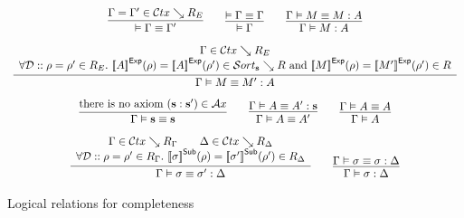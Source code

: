\begin{figure}
  \[
  \begin{array}{c}
    \infer{
      \eqctxsem \Gamma {\Gamma'}
    }{
      \Gamma = \Gamma' \in \perctx \searrow R_E
    }
    \qquad
    \infer{
      \wfctxsem \Gamma
    }{
      \eqctxsem \Gamma \Gamma
    }
    \qquad
    \infer{
      \wfexpsem \Gamma M A
    }{
      \eqexpsem \Gamma M M A
    }
    \\[8pt]
    \infer{
      \eqexpsem \Gamma M {M'} A
    }{
      \begin{array}{c}
        \Gamma \in \perctx \searrow R_E
        \\
        \forall \DD :: \rho = \rho' \in R_E.\
        \evalexpfunc A \rho = \evalexpfunc A {\rho'} \in \persort \searrow R
        ~\text{and}~
        \evalexpfunc M \rho = \evalexpfunc {M'} {\rho'} \in R
      \end{array}
    }
    \\[8pt]
    \infer{
      \eqtypsem \Gamma {\tmcst s} {\tmcst s}
    }{
      \text{there is no axiom } (\tmcst s : \tmcst s') \in \Ax
    }
    \qquad
    \infer{
      \eqtypsem \Gamma A {A'}
    }{
      \eqexpsem \Gamma A {A'} {\tmcst s}
    }
    \qquad
    \infer{
      \wftypsem \Gamma A
    }{
      \eqtypsem \Gamma A A
    }
    \\[8pt]
    \infer{
      \eqsubsem \Gamma \sigma {\sigma'} \Delta
    }{
      \begin{array}{c}
        \Gamma \in \perctx \searrow R_\Gamma
        \qquad
        \Delta \in \perctx \searrow R_\Delta
        \\
        \forall \DD :: \rho = \rho' \in R_\Gamma. \
        \evalsubfunc \sigma \rho = \evalsubfunc {\sigma'} {\rho'} \in R_\Delta
      \end{array}
    }
    \qquad
    \infer{
      \wfsubsem \Gamma \sigma \Delta
    }{
      \eqsubsem \Gamma \sigma \sigma \Delta
    }
  \end{array}
  \]
  \caption{Logical relations for completeness}
  \label{fig:logrel-comp}
\end{figure}
